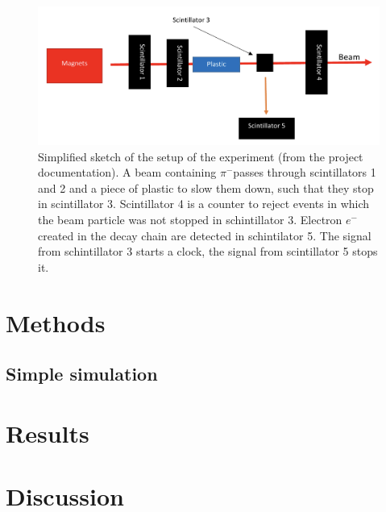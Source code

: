 \documentclass[11pt, a4paper, oneside]{book}
\newcommand{\electron}{$e^{-}$}
\newcommand{\pion}{$\pi^{-}$}
\begin{document}
\begin{figure}[htb]
\begin{center}
\includegraphics[scale=0.25]{images/experimental_setup.png}
\end{center}
\caption{Simplified sketch of the setup of the experiment (from the project documentation). A beam containing \pion passes through scintillators 1 and 2 and a piece of plastic to slow them down, such that they stop in scintillator 3. Scintillator 4 is a counter to reject events in which the beam particle was not stopped in schintillator 3. Electron \electron created in the decay chain are detected in schintilator 5. The signal from schintillator 3 starts a clock, the signal from scintillator 5 stops it.}
\label{fig:experimental_setup}
\end{figure}


\chapter{Methods}
\section{Simple simulation}

\chapter{Results}

\chapter{Discussion}


\end{document}
